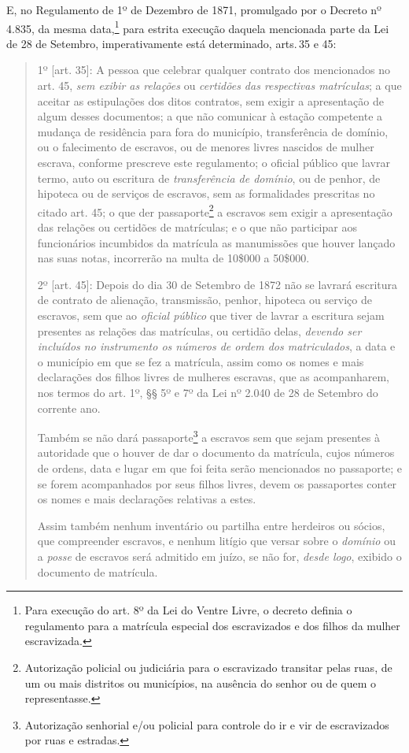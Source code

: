 E, no Regulamento de 1º de Dezembro de 1871, promulgado por o Decreto nº
4.835, da mesma data,\footnote{Para execução do art. 8º da Lei do
  Ventre Livre, o decreto definia o regulamento para a matrícula
  especial dos escravizados e dos filhos da mulher escravizada.} para
estrita execução daquela mencionada parte da Lei de 28 de Setembro,
imperativamente está determinado, arts.\,35 e 45:

\begin{quote}
1º {[}art. 35{]}: A pessoa que celebrar qualquer contrato dos
mencionados no art. 45, \emph{sem exibir as relações} ou \emph{certidões
das respectivas matrículas}; a que aceitar as estipulações dos ditos
contratos, sem exigir a apresentação de algum desses documentos; a que
não comunicar à estação competente a mudança de residência para fora do
município, transferência de domínio, ou o falecimento de escravos, ou de
menores livres nascidos de mulher escrava, conforme prescreve este
regulamento; o oficial público que lavrar termo, auto ou escritura de
\emph{transferência de domínio}, ou de penhor, de hipoteca ou de
serviços de escravos, sem as formalidades prescritas no citado art. 45;
o que der passaporte\footnote{Autorização policial ou judiciária para
  o escravizado transitar pelas ruas, de um ou mais distritos ou
  municípios, na ausência do senhor ou de quem o representasse.} a escravos
sem exigir a apresentação das relações ou certidões de matrículas; e o
que não participar aos funcionários incumbidos da matrícula as
manumissões que houver lançado nas suas notas, incorrerão na multa de
10\$000 a 50\$000.

2º {[}art. 45{]}: Depois do dia 30 de Setembro de 1872 não se lavrará
escritura de contrato de alienação, transmissão, penhor, hipoteca ou
serviço de escravos, sem que ao \emph{oficial público} que tiver de
lavrar a escritura sejam presentes as relações das matrículas, ou
certidão delas, \emph{devendo ser incluídos no instrumento os números de
ordem dos matriculados}, a data e o município em que se fez a matrícula,
assim como os nomes e mais declarações dos filhos livres de mulheres
escravas, que as acompanharem, nos termos do art. 1º, §§ 5º e 7º da Lei
nº 2.040 de 28 de Setembro do corrente ano.

Também se não dará passaporte\footnote{Autorização senhorial e/ou
  policial para controle do ir e vir de escravizados por ruas e
  estradas.} a escravos sem que sejam presentes à autoridade que o
houver de dar o documento da matrícula, cujos números de ordens, data e
lugar em que foi feita serão mencionados no passaporte; e se forem
acompanhados por seus filhos livres, devem os passaportes conter os
nomes e mais declarações relativas a estes.

Assim também nenhum inventário ou partilha entre herdeiros ou sócios,
que compreender escravos, e nenhum litígio que versar sobre o
\emph{domínio} ou a \emph{posse} de escravos será admitido em juízo, se
não for, \emph{desde logo}, exibido o documento de matrícula.
\end{quote}

